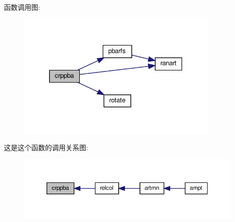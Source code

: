 函数调用图\+:
\nopagebreak
\begin{figure}[H]
\begin{center}
\leavevmode
\includegraphics[width=283pt]{crppba_8f90_a246c1d0094adf66f5065496f14ef1127_cgraph}
\end{center}
\end{figure}
这是这个函数的调用关系图\+:
\nopagebreak
\begin{figure}[H]
\begin{center}
\leavevmode
\includegraphics[width=350pt]{crppba_8f90_a246c1d0094adf66f5065496f14ef1127_icgraph}
\end{center}
\end{figure}
